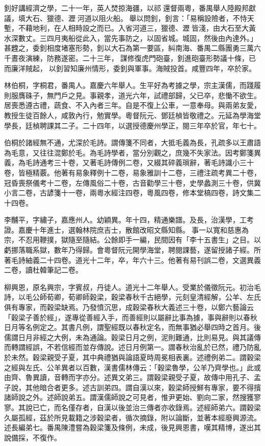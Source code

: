 \begin{pinyinscope}
釗好講經濟之學，二十一年，英人焚掠海疆，以祁還督兩粵，番禺舉人陸殿邦獻議，填大石、獵德、瀝河道以阻火船。舉以問釗，釗言：「易稱設險者，不恃天塹，不藉地利，在人相時設之而已。入省河道三，獵德、瀝皆淺，由大石至大黃，水深數丈。三四月夷船從此入，當先事防之，以固省城。城固，然後由內達外。」甚韙之，委釗相度堵塞形勢，釗以大石為第一要區，糾南海、番禺二縣團勇三萬六千晝夜演練，防務遂密。二十三年，謀修復虎門砲臺，釗進砲臺形勢議十條，已而廉洋賊起，以釗習知廉州情形，委釗與軍事。海賊投首。咸豐四年，卒於家。

林伯桐，字桐君，番禺人。嘉慶六年舉人。生平好為考據之學，宗主漢儒，而踐履則服膺硃子，無門戶之見。事親孝，道光六年，試禮部歸，父已卒，悲慟不欲生。居喪悉遵古禮，蔬食、不入內者三年。自是不復上公車，一意奉母。與兩弟友愛，教授生徒百餘人，咸敦內行，勉實學。粵督阮元、鄧廷楨皆敬禮之。元延為學海堂學長，廷楨聘課其二子。二十四年，以選授德慶州學正，閱三年卒於官，年七十。

伯桐於諸經無不通，尤深於毛詩。謂傳箋不同者，大抵毛義為長，孔疏多以王肅語為毛意，又往往混鄭於毛。為毛詩學者，當分別觀之，庶幾不失家法。因考鄭箋異義，為毛詩通考三十卷，又著毛詩傳例二卷，又綴其碎義瑣辭，著毛詩識小三十卷，皆極精覈。他著有易象釋例十二卷，易象雅訓十二卷，三禮注疏考異二十卷，冠昏喪祭儀考十二卷，左傳風俗二十卷，古音勸學三十卷，史學蠡測三十卷，供冀小言二卷，古諺箋十一卷，兩粵水經注四卷，粵風四卷，修本堂槁四卷，詩文集二十四卷。

李黼平，字繡子，嘉應州人。幼穎異。年十四，精通樂譜。及長，治漢學，工考證。嘉慶十年進士，選翰林院庶吉士，散館改昭文縣知縣。事一以寬和慈惠為宗，不忍用鞭撲，獄隨至隨結。公餘即手一編，民間因有「李十五書生」之目。以虧挪落職系獄，數年乃得歸。會粵督阮元開學海堂，聘閱課藝，遂留授諸子經。所著毛詩紬義二十四卷。道光十二年，卒，年六十三。他著有易刊誤二卷，文選異義二卷，讀杜韓筆記二卷。

柳興恩，原名興宗，字賓叔，丹徒人。道光十二年舉人。受業於儀徵阮元。初治毛詩，以毛公師荀卿，荀卿師穀梁，穀梁春秋千古絕學，元刻皇清經解，公羊、左氏俱有專家，而穀梁缺焉。乃發憤沉思，成穀梁春秋大義述三十卷，以鄭六藝論云「穀梁子善於經」，遂專從善經入手，而善經則以屬辭比事為據，事與辭則以春秋日月等名例定之。其書凡例，謂聖經既以春秋定名，而無事猶必舉四時之首月。後儒謂日月非經之大例，未為通論。穀梁日月之例，泥則難通，比則易見。與其議傳而轉謂經誤，不若信經而並存傳說。述日月例第一。謂春秋治亂於已然，禮乃防亂於未然。穀梁親受子夏，其中典禮猶與論語夏時周冕相表裏。述禮例弟二。謂穀梁之經與左氏、公羊異者以百數，漢書儒林傳云：「穀梁魯學，公羊乃齊學也。」此或由齊、魯異讀，音轉而字亦分。述異文弟三。謂穀梁親受子夏，故傳中用孔子、孟子說，其他暗合者更多。述古訓弟四。謂自漢以來，穀梁師授鮮有專家，要不得擯諸師說之外。述師說弟五。謂漢儒師說之可見者，惟尹更始、劉向二家，然搜獲寥寥。其說已亡，而名僅存者，自漢以後並治三傳者亦收錄焉。述經師弟六。謂穀梁久屬孤經，茲於所見載籍之涉穀梁者，循次摘錄，附以論斷，並著本經廢興源流。述長編弟七。番禺陳澧嘗為穀梁箋及條例，未成，後見興恩書，嘆其精博，遂出其說備採，不復作。


\end{pinyinscope}

